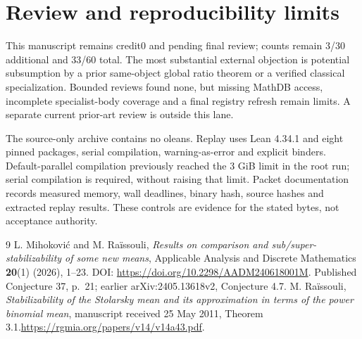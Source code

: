 \documentclass[11pt]{article}
\begin{document}
\section{Review and reproducibility limits}
This manuscript remains credit0 and pending final review; counts remain 3/30 additional and 33/60 total. The most substantial external objection is potential subsumption by a prior same-object global ratio theorem or a verified classical specialization. Bounded reviews found none, but missing MathDB access, incomplete specialist-body coverage and a final registry refresh remain limits. A separate current prior-art review is outside this lane.

The source-only archive contains no oleans. Replay uses Lean 4.34.1 and eight pinned packages, serial compilation, warning-as-error and explicit binders. Default-parallel compilation previously reached the 3 GiB limit in the root run; serial compilation is required, without raising that limit. Packet documentation records measured memory, wall deadlines, binary hash, source hashes and extracted replay results. These controls are evidence for the stated bytes, not acceptance authority.
\begin{thebibliography}{9}
 L. Mihokovi\'c and M. Ra\"issouli,
\emph{Results on comparison and sub/super-stabilizability of some new means},
Applicable Analysis and Discrete Mathematics \textbf{20}(1) (2026), 1--23.
DOI: \url{https://doi.org/10.2298/AADM240618001M}.
Published Conjecture 37, p.~21; earlier arXiv:2405.13618v2, Conjecture 4.7.
 M. Ra\"issouli, \emph{Stabilizability of the Stolarsky mean and its approximation in terms of the power binomial mean}, manuscript received 25 May 2011, Theorem 3.1.\newline\url{https://rgmia.org/papers/v14/v14a43.pdf}.
\end{thebibliography}
\end{document}
